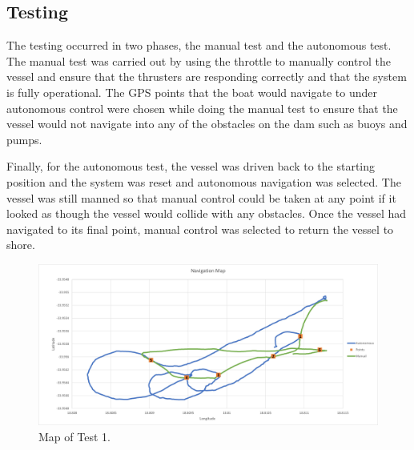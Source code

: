 \subsection{Testing}
The testing occurred in two phases, the manual test and the autonomous test. The manual test was carried out by using the throttle to manually control the vessel and ensure that the thrusters are responding correctly and that the system is fully operational. The GPS points that the boat would navigate to under autonomous control were chosen while doing the manual test to ensure that the vessel would not navigate into any of the obstacles on the dam such as buoys and pumps.\par
Finally, for the autonomous test, the vessel was driven back to the starting position and the system was reset and autonomous navigation was selected. The vessel was still manned so that manual control could be taken at any point if it looked as though the vessel would collide with any obstacles. Once the vessel had navigated to its final point, manual control was selected to return the vessel to shore. 
\begin{figure}[!hb]
	\begin{center}
		\includegraphics[width = 0.84\linewidth]{figures/graphMap.jpg}
		\caption{Map of Test 1.}
		\label{graph:4:Map}
	\end{center}
\end{figure}
\vspace{0.8cm}
